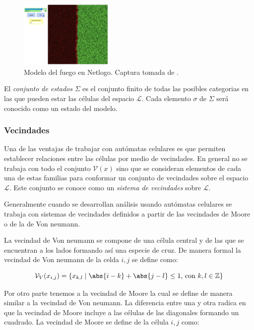 \begin{figure}[h]
  \centering
    \includegraphics[width=0.4\textwidth]{Imagenes/netlogoEx1.PNG}
  \caption{Modelo del fuego en Netlogo. Captura tomada de \cite{NetLogoFireModel}.}
  \label{fig:Fuego Netlogo}
\end{figure}

\begin{definition}\label{conjuntoDeEstados}
El \textit{conjunto de estados} $\Sigma$ es el conjunto finito de todas las posibles categorias en las que pueden estar las células del espacio $\mathcal{L}$. Cada elemento $\sigma$ de $\Sigma$ será conocido como un estado del modelo.
\end{definition}

\subsubsection{Vecindades}

Una de las ventajas de trabajar con autómatas celulares es que permiten establecer relaciones entre las células por medio de vecindades. En general no se trabaja con todo el conjunto $\mathcal{V}(x)$ sino que se consideran elementos de cada una de estas familias para conformar un conjunto de vecindades sobre el espacio $\mathcal{L}$. Este conjunto se conoce como un \textit{sistema de vecindades} sobre $\mathcal{L}$.

Generalmente cuando se desarrollan análisis usando autómatas celulares se trabaja con sistemas de vecindades definidos a partir de las vecindades de Moore o de la de Von neumann. 

La vecindad de Von neumann se compone de una célula central y de las que se encuentran a los lados formando así una especie de cruz. De manera formal la vecindad de Von neumann de la celda $i,j$ se define como:

$$\mathcal{V}_V(x_{i,j}) = \{x_{k,l}\mid\abs{i-k}+\abs{j-l}\leq1\text{, con }k,l\in\mathbb{Z}\}$$

Por otro parte tenemos a la vecindad de Moore la cual se define de manera similar a la vecindad de Von neumann. La diferencia entre una y otra radica en que la vecindad de Moore incluye a las células de las diagonales formando un cuadrado. La vecindad de Moore se define  de la célula $i,j$ como:


